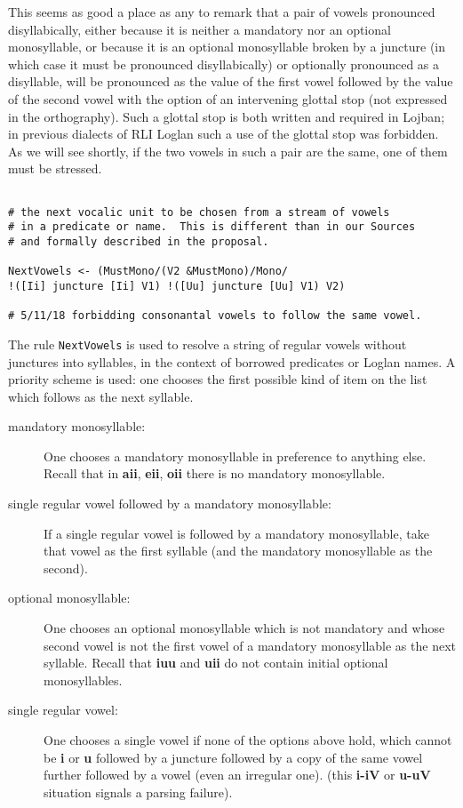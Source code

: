 \documentclass{article}
\begin{document}
This seems as good a place as any to remark that a pair of vowels pronounced disyllabically, either because it is neither a mandatory nor an optional monosyllable, or because it is an optional monosyllable broken by a juncture (in which case it must be pronounced disyllabically) or optionally pronounced as a disyllable, will be pronounced as the value of the first vowel followed by the value of the second vowel with the option of an intervening glottal stop (not expressed in the orthography).  Such a glottal stop is both written and required in Lojban;  in previous dialects of RLI Loglan such a use of the glottal stop was forbidden.  As we will see shortly, if the two vowels in such a pair are the same, one of them must be stressed.

\begin{verbatim}

# the next vocalic unit to be chosen from a stream of vowels
# in a predicate or name.  This is different than in our Sources
# and formally described in the proposal.

NextVowels <- (MustMono/(V2 &MustMono)/Mono/
!([Ii] juncture [Ii] V1) !([Uu] juncture [Uu] V1) V2)

# 5/11/18 forbidding consonantal vowels to follow the same vowel.

\end{verbatim}

The rule {\tt NextVowels} is used to resolve a string of regular vowels without junctures into syllables, in the context of borrowed predicates or Loglan names.  A priority scheme is used:  one chooses the first possible kind of item
on the list which follows as the next syllable.

\begin{description}

\item[mandatory monosyllable:]  One chooses a mandatory monosyllable in preference to anything else.  Recall that in {\bf aii}, {\bf eii}, {\bf oii} there is no mandatory monosyllable.

\item[single regular vowel followed by a mandatory monosyllable:]  If a single regular vowel is followed by a mandatory monosyllable, take that vowel as the first syllable (and the mandatory monosyllable as the second).

\item[optional monosyllable:]  One chooses an optional monosyllable which is not mandatory and whose second vowel is not the first vowel of a mandatory monosyllable as the next syllable.  Recall that {\bf iuu} and {\bf uii} do not contain initial optional monosyllables.

\item[single regular vowel:]  One chooses a single vowel if none of the options above hold, which cannot be {\bf i} or {\bf u} followed by a juncture followed by a copy of the same vowel further followed by a vowel (even an irregular one).  (this {\bf i-iV} or {\bf u-uV} situation signals a parsing failure).

\end{description}
\end{document}
